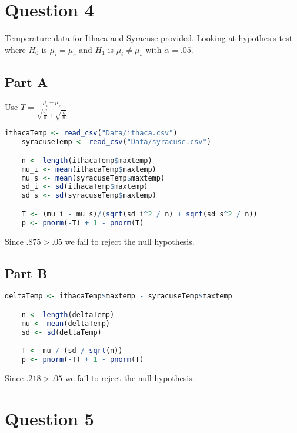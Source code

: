 \documentclass[letterpaper]{article}
\begin{document}
\newpage

\section*{Question 4}

Temperature data for Ithaca and Syracuse provided. Looking at hypothesis test where $H_0$ is $\mu_i = \mu_s$ and $H_1$ is $\mu_i \neq \mu_s$ with $\alpha = .05$.

\subsection*{Part A}

Use $T = \frac{\mu_i - \mu_s}{\sqrt{\frac{\sigma^2_i}{n}} + \sqrt{\frac{\sigma^2_s}{n}}}$

\begin{lstlisting}[language=R]
    ithacaTemp <- read_csv("Data/ithaca.csv")
    syracuseTemp <- read_csv("Data/syracuse.csv")

    n <- length(ithacaTemp$maxtemp)
    mu_i <- mean(ithacaTemp$maxtemp)
    mu_s <- mean(syracuseTemp$maxtemp)
    sd_i <- sd(ithacaTemp$maxtemp)
    sd_s <- sd(syracuseTemp$maxtemp)

    T <- (mu_i - mu_s)/(sqrt(sd_i^2 / n) + sqrt(sd_s^2 / n))
    p <- pnorm(-T) + 1 - pnorm(T)
\end{lstlisting}

\noindent Since $.875 > .05$ we fail to reject the null hypothesis.

\subsection*{Part B}

\begin{lstlisting}[language=R]
    deltaTemp <- ithacaTemp$maxtemp - syracuseTemp$maxtemp

    n <- length(deltaTemp)
    mu <- mean(deltaTemp)
    sd <- sd(deltaTemp)

    T <- mu / (sd / sqrt(n))
    p <- pnorm(-T) + 1 - pnorm(T)
\end{lstlisting}

\noindent Since $.218 > .05$ we fail to reject the null hypothesis.

\newpage

\section*{Question 5}
\end{document}

